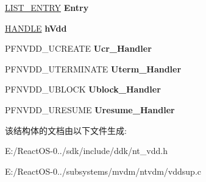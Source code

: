 \begin{DoxyCompactItemize}
\item 
\mbox{\label{struct___v_d_d___u_s_e_r___h_a_n_d_l_e_r_s_a359615b31184e53b8bbc6292e8b1f5d4}} 
\hyperlink{struct___l_i_s_t___e_n_t_r_y}{L\+I\+S\+T\+\_\+\+E\+N\+T\+RY} {\bfseries Entry}
\item 
\mbox{\label{struct___v_d_d___u_s_e_r___h_a_n_d_l_e_r_s_a34a9998480a5bb4d070acc9e5bed8326}} 
\hyperlink{interfacevoid}{H\+A\+N\+D\+LE} {\bfseries h\+Vdd}
\item 
\mbox{\label{struct___v_d_d___u_s_e_r___h_a_n_d_l_e_r_s_ac927b804b61b056a24e01ae764133197}} 
P\+F\+N\+V\+D\+D\+\_\+\+U\+C\+R\+E\+A\+TE {\bfseries Ucr\+\_\+\+Handler}
\item 
\mbox{\label{struct___v_d_d___u_s_e_r___h_a_n_d_l_e_r_s_a7d7764247cb92c6e0ca7bf7a4024d735}} 
P\+F\+N\+V\+D\+D\+\_\+\+U\+T\+E\+R\+M\+I\+N\+A\+TE {\bfseries Uterm\+\_\+\+Handler}
\item 
\mbox{\label{struct___v_d_d___u_s_e_r___h_a_n_d_l_e_r_s_a10da5b465400ddbbef6c8df4f2a2d3f0}} 
P\+F\+N\+V\+D\+D\+\_\+\+U\+B\+L\+O\+CK {\bfseries Ublock\+\_\+\+Handler}
\item 
\mbox{\label{struct___v_d_d___u_s_e_r___h_a_n_d_l_e_r_s_af8b0d0379508c20abe6532fb9fb3df1e}} 
P\+F\+N\+V\+D\+D\+\_\+\+U\+R\+E\+S\+U\+ME {\bfseries Uresume\+\_\+\+Handler}
\end{DoxyCompactItemize}


该结构体的文档由以下文件生成\+:\begin{DoxyCompactItemize}
\item 
E\+:/\+React\+O\+S-\/0../sdk/include/ddk/nt\+\_\+vdd.\+h\item 
E\+:/\+React\+O\+S-\/0../subsystems/mvdm/ntvdm/vddsup.\+c\end{DoxyCompactItemize}
